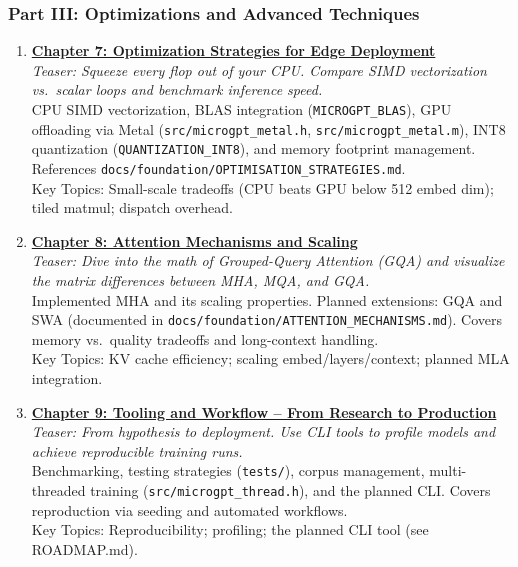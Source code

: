 \documentclass[
]{article}
\begin{document}
\subsubsection{Part III: Optimizations and Advanced
Techniques}\label{part-iii-optimizations-and-advanced-techniques}

\begin{enumerate}
\def\labelenumi{\arabic{enumi}.}
\setcounter{enumi}{6}
\item
  \textbf{\href{7.md}{Chapter 7: Optimization Strategies for Edge
  Deployment}}\\
  \emph{Teaser: Squeeze every flop out of your CPU. Compare SIMD
  vectorization vs.~scalar loops and benchmark inference speed.}\\
  CPU SIMD vectorization, BLAS integration (\texttt{MICROGPT\_BLAS}),
  GPU offloading via Metal (\texttt{src/microgpt\_metal.h},
  \texttt{src/microgpt\_metal.m}), INT8 quantization
  (\texttt{QUANTIZATION\_INT8}), and memory footprint management.
  References \texttt{docs/foundation/OPTIMISATION\_STRATEGIES.md}.\\
  Key Topics: Small-scale tradeoffs (CPU beats GPU below 512 embed dim);
  tiled matmul; dispatch overhead.
\item
  \textbf{\href{8.md}{Chapter 8: Attention Mechanisms and Scaling}}\\
  \emph{Teaser: Dive into the math of Grouped-Query Attention (GQA) and
  visualize the matrix differences between MHA, MQA, and GQA.}\\
  Implemented MHA and its scaling properties. Planned extensions: GQA
  and SWA (documented in
  \texttt{docs/foundation/ATTENTION\_MECHANISMS.md}). Covers memory
  vs.~quality tradeoffs and long-context handling.\\
  Key Topics: KV cache efficiency; scaling embed/layers/context; planned
  MLA integration.
\item
  \textbf{\href{9.md}{Chapter 9: Tooling and Workflow -- From Research
  to Production}}\\
  \emph{Teaser: From hypothesis to deployment. Use CLI tools to profile
  models and achieve reproducible training runs.}\\
  Benchmarking, testing strategies (\texttt{tests/}), corpus management,
  multi-threaded training (\texttt{src/microgpt\_thread.h}), and the
  planned CLI. Covers reproduction via seeding and automated
  workflows.\\
  Key Topics: Reproducibility; profiling; the planned CLI tool (see
  ROADMAP.md).
\end{enumerate}
\end{document}
